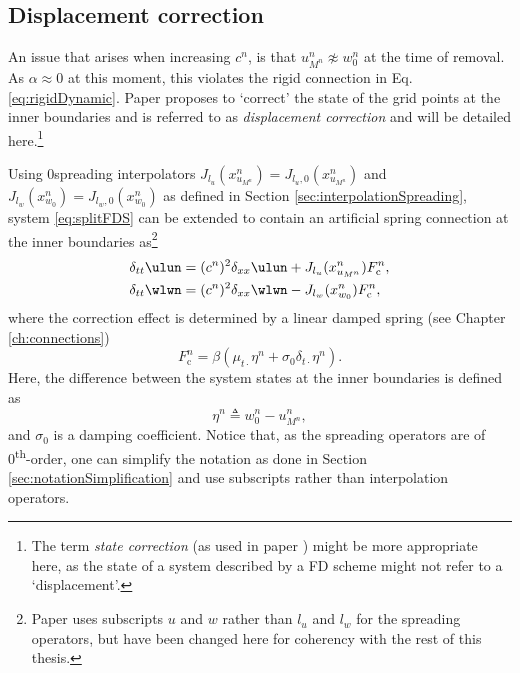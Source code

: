\subsection{Displacement correction}
An issue that arises when increasing $c^n$, is that $u_{M^n}^n \not\approx w_0^n$ at the time of removal. As $\alpha \approx 0$ at this moment, this violates the rigid connection in Eq. \eqref{eq:rigidDynamic}.
Paper \citeP[G] proposes to `correct' the state of the grid points at the inner boundaries and is referred to as \textit{displacement correction} and will be detailed here.\footnote{The term \textit{state correction} (as used in paper \citeP[H]) might be more appropriate here, as the state of a system described by a FD scheme might not refer to a `displacement'.} 

Using 0\thOrder spreading interpolators  $J_{l_u}(x_{u_{M^n}}^n) = J_{l_u, 0}(x_{u_{M^n}}^n)$ and \linebreak$J_{l_w}(x_{w_0}^n) = J_{l_w,0}(x_{w_0}^n)$ as defined in Section \ref{sec:interpolationSpreading}, system \eqref{eq:splitFDS} can be extended to contain an artificial spring connection at the inner boundaries as\footnote{Paper \citeP[G] uses subscripts $u$ and $w$ rather than $l_u$ and $l_w$ for the spreading operators, but have been changed here for coherency with the rest of this thesis.}
\begin{subequations}\label{eq:sysDispCorr}
\begin{align}
    \delta_{tt}\ulun &= (c^n)^2\delta_{xx}\ulun+ J_{l_u}(x_{u_{M^n}}^n)%
    F_\text{c}^n,\\
    \delta_{tt}\wlwn &= (c^n)^2\delta_{xx}\wlwn - J_{l_w}(x_{w_0}^n)%
    F_\text{c}^n,
\end{align}
\end{subequations}
where the correction effect %
is determined by a linear damped spring (see Chapter \ref{ch:connections})
\begin{equation}\label{eq:dispCorrForce}
    F_\text{c}^n = \beta \left(\mu_{t\cdot}\eta^n +\sigma_0\delta_{t\cdot}\eta^n \right).
\end{equation}
Here, the difference between the system states at the inner boundaries is defined as
\begin{equation}\label{eq:etaDispCorr}
    \eta^n \triangleq w_0^n - u_{M^n}^n,
\end{equation}
and $\sigma_0$ is a damping coefficient. Notice that, as the spreading operators are of 0\textsuperscript{th}-order, one can simplify the notation as done in Section \ref{sec:notationSimplification} and use subscripts rather than interpolation operators.

